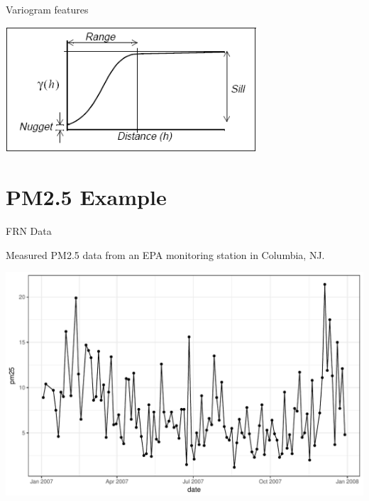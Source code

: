 \documentclass[11pt,ignorenonframetext,]{beamer}
\begin{document}
\begin{frame}{Variogram features}

\begin{center}
\includegraphics[width=0.7\textwidth]{figs/variogram.png}
\end{center}

\end{frame}

\section{PM2.5 Example}\label{pm2.5-example}

\begin{frame}{FRN Data}

Measured PM2.5 data from an EPA monitoring station in Columbia, NJ.

\includegraphics{Lec13_files/figure-beamer/unnamed-chunk-10-1.pdf}

\end{frame}
\end{document}
